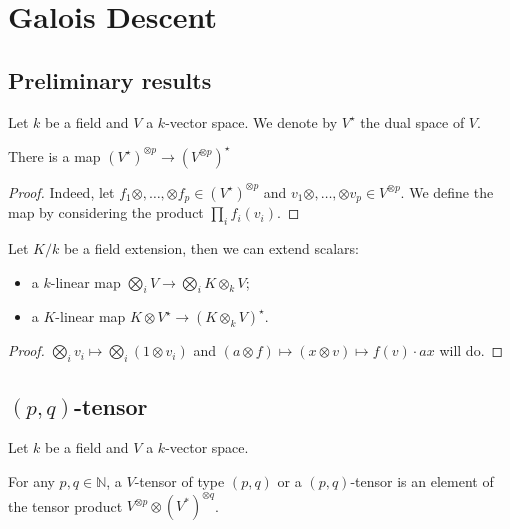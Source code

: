\section{Galois Descent}

\subsection{Preliminary results}
Let $k$ be a field and $V$ a $k$-vector space. We denote by $V^{\star}$ the dual space of $V$.

\begin{lemma}\label{lem:dual-tensor-power}
  There is a map $(V^{\star})^{\otimes p} \to (V^{\otimes p})^\star$
  \leanok
\end{lemma}
\begin{proof}
Indeed, let $f_1 \otimes, \dots, \otimes f_p \in (V^{\star})^{\otimes p}$ and $v_1 \otimes, \dots, \otimes v_p \in V^{\otimes p}$. We define the map by considering the product $\prod_{i} f_i (v_i)$.
\end{proof}

\begin{lemma}\label{lem:extend-scalars}
  \leanok%
  Let $K/k$ be a field extension, then we can extend scalars:
  \begin{itemize}
    \item a $k$-linear map $\bigotimes_{i} V \to \bigotimes_{i} K \otimes_{k} V$;
    \item a $K$-linear map $K \otimes V^{\star} \to \left(K \otimes_{k} V\right)^{\star}$.
  \end{itemize}
\end{lemma}

\begin{proof}
  $\bigotimes_{i} v_{i} \mapsto \bigotimes_{i} (1\otimes v_{i})$ and $(a \otimes f) \mapsto (x \otimes v) \mapsto f(v)\cdot ax$ will do.
\end{proof}

\subsection{$(p, q)$-tensor}\label{sec:p-q-tensor}

Let $k$ be a field and $V$ a $k$-vector space.

\begin{definition}\label{def:tensor-of-type}%
  For any $p, q \in \mathbb{N}$, a $V$-tensor of type $(p,q)$ or a $(p, q)$-tensor is an element of the tensor product $V^{\otimes p} \otimes {(V^*)}^{\otimes q}$.
  \leanok%
\end{definition}


